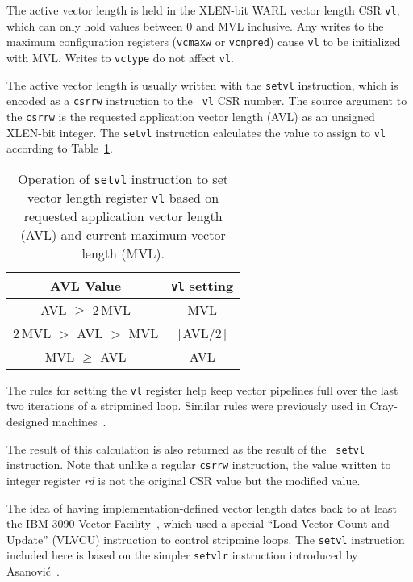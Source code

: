 The active vector length is held in the XLEN-bit WARL vector length
CSR {\tt vl}, which can only hold values between 0 and MVL inclusive.
Any writes to the maximum configuration registers ({\tt vcmaxw} or
{\tt vcnpred}) cause {\tt vl} to be initialized with MVL.  Writes to
{\tt vctype} do not affect {\tt vl}.

The active vector length is usually written with the {\tt setvl}
instruction, which is encoded as a {\tt csrrw} instruction to the {\tt
  vl} CSR number.  The source argument to the {\tt csrrw} is the
requested application vector length (AVL) as an unsigned XLEN-bit
integer. The {\tt setvl} instruction calculates the value to assign to
{\tt vl} according to Table~\ref{tab:vlcalc}.

\begin{table}
  \centering
  \begin{tabular}{|c|c|}
    \hline
    AVL Value & {\tt vl} setting \\
    \hline
    AVL $\geq$ 2\,MVL & MVL \\
    2\,MVL $>$ AVL $>$ MVL & $\lfloor$AVL$/2\rfloor$ \\
    MVL $\geq$ AVL & AVL \\
    \hline
  \end{tabular}
  \caption{Operation of {\tt setvl} instruction to set vector
    length register {\tt vl} based on requested application vector
    length (AVL) and current maximum vector length (MVL).}
  \label{tab:vlcalc}
\end{table}

\begin{commentary}
  The rules for setting the {\tt vl} register help keep vector
  pipelines full over the last two iterations of a stripmined loop.
  Similar rules were previously used in Cray-designed machines~\cite{crayx1asm}.
\end{commentary}

The result of this calculation is also returned as the result of the {\tt
setvl} instruction.  Note that unlike a regular {\tt csrrw} instruction, the
value written to integer register {\em rd} is not the original CSR value but
the modified value.

\begin{commentary}
  The idea of having implementation-defined vector length dates back
  to at least the IBM 3090 Vector Facility~\cite{ibm370varch}, which
  used a special ``Load Vector Count and Update'' (VLVCU) instruction
  to control stripmine loops.  The {\tt setvl} instruction included
  here is based on the simpler {\tt setvlr} instruction introduced by
  Asanovi\'{c}~\cite{krstephd}.
\end{commentary}

